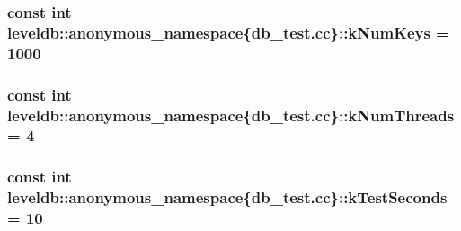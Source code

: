 \subsubsection[{k\+Num\+Keys}]{\setlength{\rightskip}{0pt plus 5cm}const int leveldb\+::anonymous\+\_\+namespace\{db\+\_\+test.\+cc\}\+::k\+Num\+Keys = 1000\hspace{0.3cm}{\ttfamily [static]}}\label{namespaceleveldb_1_1anonymous__namespace_02db__test_8cc_03_a27ae32b8ef5b6166eb680ef2740ac7f7}
\hypertarget{namespaceleveldb_1_1anonymous__namespace_02db__test_8cc_03_af135e865a9f018d5bbf890a1c60aeed0}{}
\subsubsection[{k\+Num\+Threads}]{\setlength{\rightskip}{0pt plus 5cm}const int leveldb\+::anonymous\+\_\+namespace\{db\+\_\+test.\+cc\}\+::k\+Num\+Threads = 4\hspace{0.3cm}{\ttfamily [static]}}\label{namespaceleveldb_1_1anonymous__namespace_02db__test_8cc_03_af135e865a9f018d5bbf890a1c60aeed0}
\hypertarget{namespaceleveldb_1_1anonymous__namespace_02db__test_8cc_03_a1dd70bf55ed2f6a85462480871d5a32d}{}
\subsubsection[{k\+Test\+Seconds}]{\setlength{\rightskip}{0pt plus 5cm}const int leveldb\+::anonymous\+\_\+namespace\{db\+\_\+test.\+cc\}\+::k\+Test\+Seconds = 10\hspace{0.3cm}{\ttfamily [static]}}\label{namespaceleveldb_1_1anonymous__namespace_02db__test_8cc_03_a1dd70bf55ed2f6a85462480871d5a32d}
